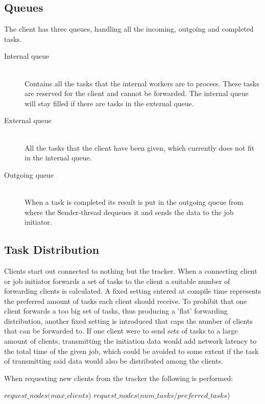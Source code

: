 \subsection{Queues}
The client has three queues, handling all the incoming, outgoing and completed
tasks.
\begin{description}
	\item[Internal queue] \hfill \\
	Contains all the tasks that the internal workers are to process. These tasks
	are reserved for the client and cannot be forwarded. The internal queue will
	stay filled if there are tasks in the external queue.
	\item[External queue] \hfill \\
	All the tasks that the client have been given, which currently does not 
	fit in the internal queue.
	\item[Outgoing queue] \hfill \\
	When a task is completed its result is put in the outgoing queue from where
	the Sender-thread dequeues it and sends the data to the job initiator.
\end{description}

\subsection{Task Distribution}
Clients start out connected to nothing but the tracker. When a connecting client
or job initiator forwards a set of tasks to the client a suitable number of
forwarding clients is calculated. A fixed setting entered at compile time represents
the preferred amount of tasks each client should receive. To prohibit that one
client forwards a too big set of tasks, thus producing a 'flat' forwarding
distribution, another fixed setting is introduced that caps the number of
clients that can be forwarded to. If one client were to send sets of tasks to a
large amount of clients, transmitting the initiation data would add network
latency to the total time of the given job, which could be avoided to some
extent if the task of transmitting said data would also be distributed among the
clients.

When requesting new clients from the tracker
the following is performed: \\

\begin{samepage}
\begin{algorithmic}
\STATE {}
	\STATE $request\_nodes(max\_clients$)
\ELSE
	\STATE $request\_nodes(num\_tasks/preferred\_tasks$)
\ENDIF
\end{algorithmic}
\end{samepage}

